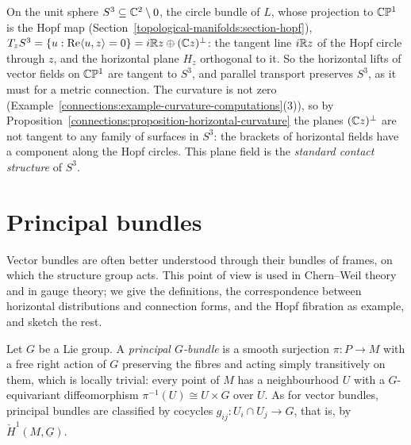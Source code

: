 \begin{example}
\begin{enumerate}
\[\]
On the unit sphere $S^3 \subseteq \mathbb{C}^2 \setminus 0$, the circle bundle of $L$, whose projection to $\mathbb{C}\mathbb{P}^1$ is the Hopf map (Section~\ref{topological-manifolds:section-hopf}),
$T_zS^3 = \{u : \operatorname{Re}\langle u, z\rangle = 0\} = i\mathbb{R} z \oplus (\mathbb{C} z)^\perp$: the tangent line $i\mathbb{R} z$ of the Hopf circle through $z$, and the horizontal plane $H_z$
orthogonal to it. So the horizontal lifts of vector fields on $\mathbb{C}\mathbb{P}^1$ are tangent to $S^3$, and parallel transport preserves $S^3$, as it must for a metric connection. The curvature is
not zero (Example~\ref{connections:example-curvature-computations}(3)), so by Proposition~\ref{connections:proposition-horizontal-curvature} the planes $(\mathbb{C} z)^\perp$ are not tangent to any
family of surfaces in $S^3$: the brackets of horizontal fields have a component along the Hopf circles. This plane field is the \emph{standard contact structure} of $S^3$.
\end{enumerate}
\end{example}
\section{Principal bundles}\label{connections:section-principal}

Vector bundles are often better understood through their bundles of frames, on which the structure group acts. This point of view is used in Chern--Weil theory and in gauge
theory; we give the definitions, the correspondence between horizontal distributions and connection forms, and the Hopf fibration as
example, and sketch the rest.

\begin{definition}\label{connections:definition-principal-bundle}
Let $G$ be a Lie group. A \emph{principal $G$-bundle} is a smooth surjection $\pi \colon P \to M$ with a free right action of $G$ preserving the fibres and acting simply transitively on them, which is locally
trivial: every point of $M$ has a neighbourhood $U$ with a $G$-equivariant diffeomorphism $\pi^{-1}(U) \cong U \times G$ over $U$. As for vector bundles, principal bundles are classified by cocycles
$g_{ij} \colon U_i \cap U_j \to G$, that is, by $\check{H}^1(M, \underline{G})$.
\end{definition}

